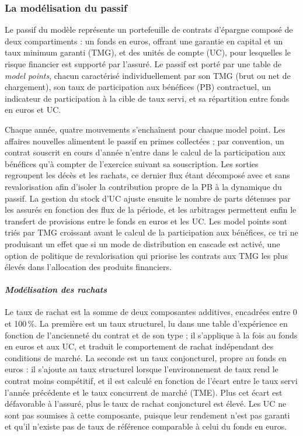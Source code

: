 \subsubsection{La modélisation du passif}

Le passif du modèle représente un portefeuille de contrats d'épargne composé de deux compartiments : un fonds en euros, offrant une garantie en capital et un taux minimum garanti (TMG), et des unités de compte (UC), pour lesquelles le risque financier est supporté par l'assuré. Le passif est porté par une table de \textit{model points}, chacun caractérisé individuellement par son TMG (brut ou net de chargement), son taux de participation aux bénéfices (PB) contractuel, un indicateur de participation à la cible de taux servi, et sa répartition entre fonds en euros et UC.

Chaque année, quatre mouvements s'enchaînent pour chaque model point. Les affaires nouvelles alimentent le passif en primes collectées ; par convention, un contrat souscrit en cours d'année n'entre dans le calcul de la participation aux bénéfices qu'à compter de l'exercice suivant sa souscription. Les sorties regroupent les décès et les rachats, ce dernier flux étant décomposé avec et sans revalorisation afin d'isoler la contribution propre de la PB à la dynamique du passif. La gestion du stock d'UC ajuste ensuite le nombre de parts détenues par les assurés en fonction des flux de la période, et les arbitrages permettent enfin le transfert de provisions entre le fonds en euros et les UC. Les model points sont triés par TMG croissant avant le calcul de la participation aux bénéfices, ce tri ne produisant un effet que si un mode de distribution en cascade est activé, une option de politique de revalorisation qui priorise les contrats aux TMG les plus élevés dans l'allocation des produits financiers.

\paragraph{\textit{Modélisation des rachats}} \hfill\break
Le taux de rachat est la somme de deux composantes additives, encadrées entre 0 et 100\,\%. La première est un taux structurel, lu dans une table d'expérience en fonction de l'ancienneté du contrat et de son type ; il s'applique à la fois au fonds en euros et aux UC, et traduit le comportement de rachat indépendant des conditions de marché. La seconde est un taux conjoncturel, propre au fonds en euros : il s'ajoute au taux structurel lorsque l'environnement de taux rend le contrat moins compétitif, et il est calculé en fonction de l'écart entre le taux servi l'année précédente et le taux concurrent de marché (TME). Plus cet écart est défavorable à l'assuré, plus le taux de rachat conjoncturel est élevé. Les UC ne sont pas soumises à cette composante, puisque leur rendement n'est pas garanti et qu'il n'existe pas de taux de référence comparable à celui du fonds en euros.


